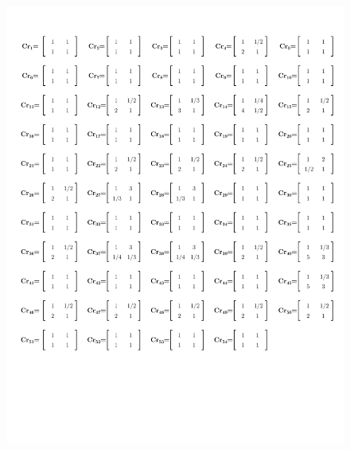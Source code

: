 \newpage
\begin{figure}[H]
	\centering
	\includegraphics[width=14.5cm]{imagenes/54MatricesNormalMejoradoEx}
	\label{fig:MNormal1Ex1}
\end{figure}

